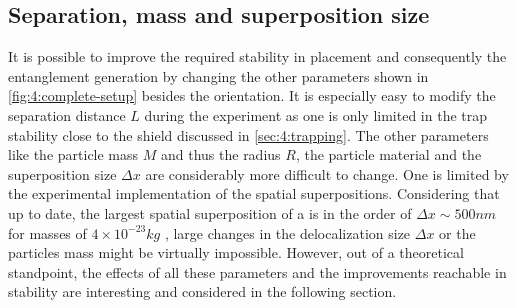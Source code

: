 \newpage
\subsection{Separation, mass and superposition size}
It is possible to improve the required stability in placement and consequently the entanglement generation by changing the other parameters shown in \cref{fig:4:complete-setup} besides the orientation. 
It is especially easy to modify the separation distance $L$ during the experiment as one is only limited in the trap stability close to the shield discussed in \cref{sec:4:trapping}. The other parameters like the particle mass $M$ and thus the radius $R$, the particle material and the superposition size $\Delta x$ are considerably more difficult to change.  
One is limited by the experimental implementation of the spatial superpositions. Considering that up to date, the largest spatial superposition of a  is in the order of $\Delta x \sim 500\si{nm}$ for masses of $4\times 10^{-23}\si{kg}$ \cite{Fein_2019}, large changes in the delocalization size $\Delta x$ or the particles mass might be virtually impossible.
However, out of a theoretical standpoint, the effects of all these parameters and the improvements reachable in stability are interesting and considered in the following section.

